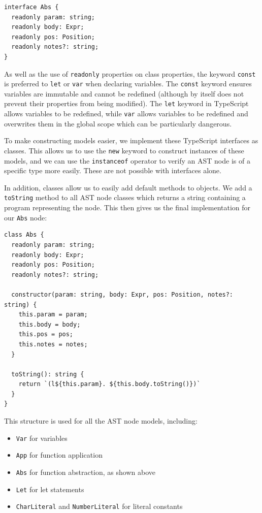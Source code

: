 \documentclass[a4paper,fleqn,oneside,12pt]{report}
\begin{document}
\begin{verbatim}
interface Abs {
  readonly param: string;
  readonly body: Expr;
  readonly pos: Position;
  readonly notes?: string;
}
\end{verbatim}
As well as the use of \texttt{readonly} properties on class properties, the keyword \texttt{const} is preferred to \texttt{let} or \texttt{var} when declaring variables. The \texttt{const} keyword ensures variables are immutable and cannot be redefined (although by itself does not prevent their properties from being modified). The \texttt{let} keyword in TypeScript allows variables to be redefined, while \texttt{var} allows variables to be redefined and overwrites them in the global scope which can be particularly dangerous.

To make constructing models easier, we implement these TypeScript interfaces as classes. This allows us to use the \texttt{new} keyword to construct instances of these models, and we can use the \texttt{instanceof} operator to verify an AST node is of a specific type more easily. These are not possible with interfaces alone.

In addition, classes allow us to easily add default methods to objects. We add a \texttt{toString} method to all AST node classes which returns a string containing a program representing the node. This then gives us the final implementation for our \texttt{Abs} node:

\begin{verbatim}
class Abs {
  readonly param: string;
  readonly body: Expr;
  readonly pos: Position;
  readonly notes?: string;

  constructor(param: string, body: Expr, pos: Position, notes?: string) {
    this.param = param;
    this.body = body;
    this.pos = pos;
    this.notes = notes;
  }

  toString(): string {
    return `(l${this.param}. ${this.body.toString()})`
  }
}
\end{verbatim}

This structure is used for all the AST node models, including:
\begin{itemize}
  \item \texttt{Var} for variables
  \item \texttt{App} for function application
  \item \texttt{Abs} for function abstraction, as shown above
  \item \texttt{Let} for let statements
  \item \texttt{CharLiteral} and \texttt{NumberLiteral} for literal constants
\end{itemize}
\end{document}
